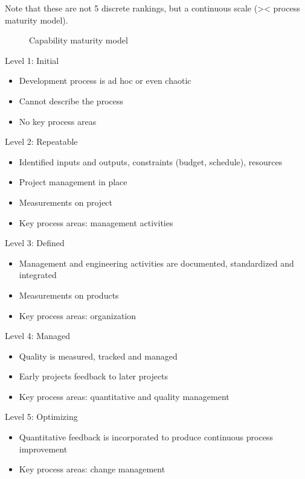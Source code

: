 Note that these are not 5 discrete rankings, but a continuous scale (>< process maturity model).

\begin{figure}[!ht]
    \centering
    \begin{scriptsize}
        
    \end{scriptsize}
    \caption{Capability maturity model}
\end{figure}

Level 1: Initial
\begin{itemize}
    \item Development process is ad hoc or even chaotic
    \item Cannot describe the process
    \item No key process areas
\end{itemize}

Level 2: Repeatable
\begin{itemize}
    \item Identified inputs and outputs, constraints (budget, schedule), resources
    \item Project management in place
    \item Measurements on project
    \item Key process areas: management activities
\end{itemize}

Level 3: Defined
\begin{itemize}
    \item Management and engineering activities are documented, standardized and integrated
    \item Measurements on products
    \item Key process areas: organization
\end{itemize}

Level 4: Managed
\begin{itemize}
    \item Quality is measured, tracked and managed
    \item Early projects feedback to later projects
    \item Key process areas: quantitative and quality management
\end{itemize}

Level 5: Optimizing
\begin{itemize}
    \item Quantitative feedback is incorporated to produce continuous process improvement
    \item Key process areas: change management
\end{itemize}

